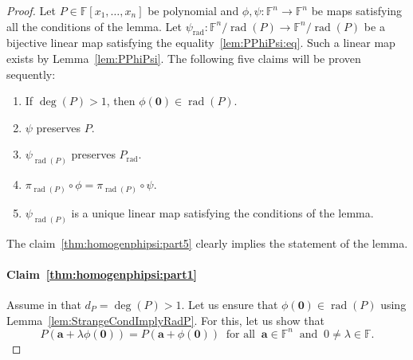 \documentclass{elsarticle}
\DeclareMathOperator{\rad}{rad}
\def\F{{\mathbb F}}
\theoremstyle{definition}
\numberwithin{equation}{section}
\begin{document}
\begin{proof}Let $P \in \F[x_1,\ldots, x_n]$ be polynomial and $\phi, \psi\colon \F^n \to \F^n$ be maps satisfying all the conditions of the lemma.  Let $\psi_{\rad}\colon \F^n / \rad(P) \to \F^n / \rad(P)$ be a bijective linear map satisfying the equality~\eqref{lem:PPhiPsi:eq}. Such a linear map exists by Lemma~\eqref{lem:PPhiPsi}. The following five claims will be proven sequently:
\begin{enumerate}[label=(\roman*), ref=(\roman*)]
\item\label{thm:homogenphipsi:part1} If $\deg(P) > 1$, then $\phi(\mathbf 0) \in \rad(P)$.
\item\label{thm:homogenphipsi:part2} $\psi$ preserves $P$.
\item\label{thm:homogenphipsi:part3} $\psi_{\rad(P)}$ preserves $P_{\rad}$.
\item\label{thm:homogenphipsi:part4} $\pi_{\rad(P)} \circ \phi = \pi_{\rad(P)} \circ \psi$.
\item\label{thm:homogenphipsi:part5} $\psi_{\rad(P)}$ is a unique linear map satisfying the conditions of the lemma.
\end{enumerate}
The claim~\ref{thm:homogenphipsi:part5} clearly implies the statement of the lemma.
\paragraph{Claim~\ref{thm:homogenphipsi:part1}}%
Assume in that  $d_P = \deg(P) > 1$. Let us ensure that $\phi(\mathbf 0) \in \rad(P)$ using Lemma~\ref{lem:StrangeCondImplyRadP}. For this, let us show that
\begin{equation}\label{thm:homogenphipsi:eq77}
P(\mathbf a + \lambda \phi (\mathbf 0)) = P(\mathbf a + \phi (\mathbf 0))\;\;\mbox{for all}\;\;\mathbf a \in \F^n\;\;\mbox{and}\;\;0\neq \lambda \in \F.
\end{equation}


\end{proof}
\end{document}
